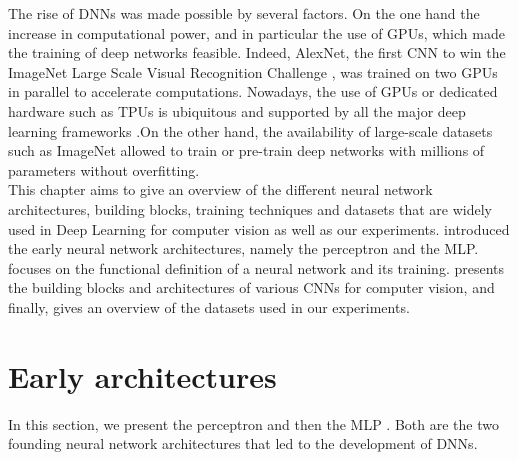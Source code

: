 The rise of \acp{DNN} was made possible by several factors. On the one hand the
increase in computational power, and in particular the use of \acp{GPU}, which
made the training of deep networks feasible. Indeed, AlexNet, the first \ac{CNN}
to win the ImageNet Large Scale Visual Recognition Challenge
\cite{DBLP:conf/nips/KrizhevskySH12}, was trained on two \acp{GPU} in parallel
to accelerate computations. Nowadays, the use of \acp{GPU} or dedicated hardware
such as \acp{TPU} is ubiquitous and supported by all the major deep learning
frameworks
\cite{DBLP:journals/corr/AbadiABBCCCDDDG16,DBLP:conf/nips/PaszkeGMLBCKLGA19}.On
the other hand, the availability of large-scale datasets such as ImageNet
\cite{deng2009imagenet} allowed to train or pre-train deep networks with
millions of parameters without overfitting.\\

This chapter aims to give an overview of the different neural network
architectures, building blocks, training techniques and datasets that are widely
used in Deep Learning for computer vision as well as our experiments.
 introduced the early neural network
architectures, namely the perceptron and the \ac{MLP}. 
focuses on the functional definition of a neural network and its training.
 presents the building blocks and architectures of various
\acp{CNN} for computer vision, and finally,  gives an
overview of the datasets used in our experiments.


\section{Early architectures}\label{sec:dlo:early_architectures}

In this section, we present the perceptron \cite{rosenblatt1958perceptron} and
then the \acl{MLP} \cite{rosenblatt1961principles,rumelhart1986learning}. Both
are the two founding neural network architectures that led to the development of
\aclp{DNN}.

